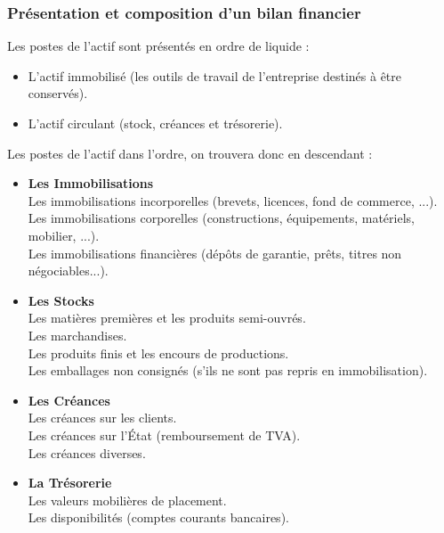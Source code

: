 \documentclass[a4paper,10pt]{article}
\begin{document}
	\subsubsection{Présentation et composition d’un bilan financier}
Les postes de l’actif sont présentés en ordre de liquide : \\
       \begin{itemize}     
        \item L’actif immobilisé (les outils de travail de l’entreprise destinés à être conservés). \\
        \item L’actif circulant (stock, créances et trésorerie).\\
       \end{itemize} 
\par Les postes de l’actif dans l’ordre, on trouvera donc en descendant : \\
	\begin{itemize}
\item \textbf{Les Immobilisations} \\
		 Les immobilisations incorporelles (brevets, licences, fond de commerce, ...). \\
         Les immobilisations corporelles (constructions, équipements, matériels, mobilier, ...). \\
         Les immobilisations financières (dépôts de garantie, prêts, titres non négociables...). \\
\item \textbf{Les Stocks} \\
		 Les matières premières et les produits semi-ouvrés. \\
         Les  marchandises.\\
         Les produits finis et les encours de productions.\\ 
         Les emballages non consignés (s'ils ne sont pas repris en immobilisation).\\ 
\item \textbf{Les Créances} \\
		 Les créances sur les clients.\\ 
         Les créances sur l'État (remboursement de TVA). \\
         Les créances diverses. \\

\item \textbf{La Trésorerie}\\
	 	Les valeurs mobilières de placement. \\
        Les disponibilités (comptes courants bancaires).\\	
	\end{itemize}
\end{document}
